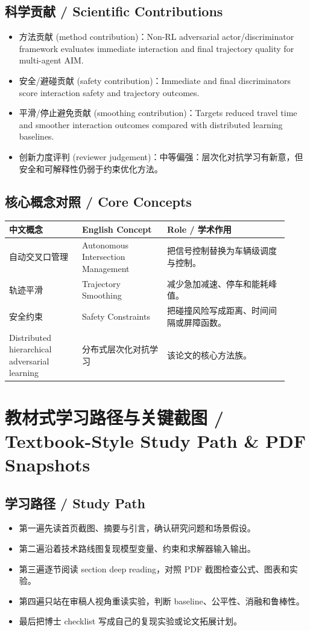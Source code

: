 \documentclass[UTF8,a4paper,11pt,fontset=fandol]{ctexart}
\begin{document}
\subsection{科学贡献 / Scientific Contributions}
\begin{itemize}
\item 方法贡献 (method contribution)：Non-RL adversarial actor/discriminator framework evaluates immediate interaction and final trajectory quality for multi-agent AIM.
\item 安全/避碰贡献 (safety contribution)：Immediate and final discriminators score interaction safety and trajectory outcomes.
\item 平滑/停止避免贡献 (smoothing contribution)：Targets reduced travel time and smoother interaction outcomes compared with distributed learning baselines.
\item 创新力度评判 (reviewer judgement)：中等偏强：层次化对抗学习有新意，但安全和可解释性仍弱于约束优化方法。
\end{itemize}


\subsection{核心概念对照 / Core Concepts}
\begin{longtable}{p{0.24\linewidth}p{0.28\linewidth}p{0.40\linewidth}}
\toprule
中文概念 & English Concept & Role / 学术作用\\
\midrule
自动交叉口管理 & Autonomous Intersection Management & 把信号控制替换为车辆级调度与控制。 \\
轨迹平滑 & Trajectory Smoothing & 减少急加减速、停车和能耗峰值。 \\
安全约束 & Safety Constraints & 把碰撞风险写成距离、时间间隔或屏障函数。 \\
Distributed hierarchical adversarial learning & 分布式层次化对抗学习 & 该论文的核心方法族。 \\
\bottomrule
\end{longtable}

\section{教材式学习路径与关键截图 / Textbook-Style Study Path \& PDF Snapshots}
\subsection{学习路径 / Study Path}
\begin{itemize}
\item 第一遍先读首页截图、摘要与引言，确认研究问题和场景假设。
\item 第二遍沿着技术路线图复现模型变量、约束和求解器输入输出。
\item 第三遍逐节阅读 section deep reading，对照 PDF 截图检查公式、图表和实验。
\item 第四遍只站在审稿人视角重读实验，判断 baseline、公平性、消融和鲁棒性。
\item 最后把博士 checklist 写成自己的复现实验或论文拓展计划。
\end{itemize}
\end{document}
